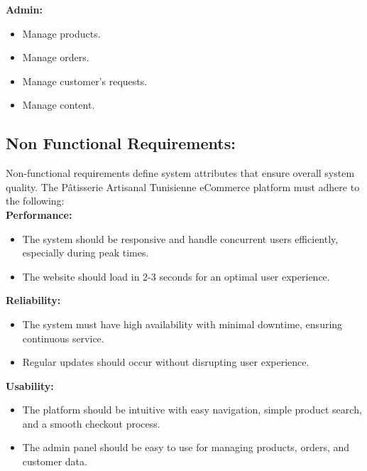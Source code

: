 \newpage
\textbf{Admin:}\\

\begin{itemize}[label=\textbullet]
    \item Manage products.
    \item Manage orders.
    \item Manage customer’s requests.
    \item Manage content.
\end{itemize}

\subsection{Non Functional Requirements:}

Non-functional requirements define system attributes that ensure overall system quality. The Pâtisserie Artisanal Tunisienne eCommerce platform must adhere to the following:\\

\textbf{Performance:}\\

\begin{itemize}[label=\textbullet]
    \item The system should be responsive and handle concurrent users efficiently, especially during peak times.
    \item The website should load in 2-3 seconds for an optimal user experience.\\
\end{itemize}
        
\textbf{Reliability:}\\

\begin{itemize}[label=\textbullet]
    \item The system must have high availability with minimal downtime, ensuring continuous service.
    \item Regular updates should occur without disrupting user experience.\\
\end{itemize}

\textbf{Usability:}\\

\begin{itemize}[label=\textbullet]
    \item The platform should be intuitive with easy navigation, simple product search, and a smooth checkout process.
    \item The admin panel should be easy to use for managing products, orders, and customer data.\\
\end{itemize}

